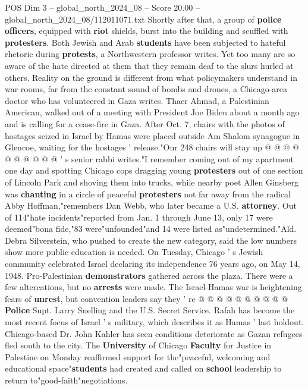 \begin{textsample}{POS Dim 3 – global\_north\_2024\_08 – Score 20.00 – global\_north\_2024\_08/112011071.txt}
Shortly after that, a group of \textbf{police} \textbf{officers}, equipped with \textbf{riot} shields, burst into the building and scuffled with \textbf{protesters}.
Both Jewish and Arab \textbf{students} have been subjected to hateful rhetoric during \textbf{protests}, a Northwestern professor writes.
Yet too many are so aware of the hate directed at them that they remain deaf to the slurs hurled at others.
Reality on the ground is different from what policymakers understand in war rooms, far from the constant sound of bombs and drones, a Chicago-area doctor who has volunteered in Gaza writes.
Thaer Ahmad, a Palestinian American, walked out of a meeting with President Joe Biden about a month ago and is calling for a cease-fire in Gaza.
After Oct. 7, chairs with the photos of hostages seized in Israel by Hamas were placed outside Am Shalom synagogue in Glencoe, waiting for the hostages ' release."Our 248 chairs will stay up @ @ @ @ @ @ @ @ @ @ ' s senior rabbi writes."I remember coming out of my apartment one day and spotting Chicago cops dragging young \textbf{protesters} out of one section of Lincoln Park and shoving them into trucks, while nearby poet Allen Ginsberg was \textbf{chanting} in a circle of peaceful \textbf{protesters} not far away from the radical Abby Hoffman,"remembers Dan Webb, who later became a U.S. \textbf{attorney}.
Out of 114"hate incidents"reported from Jan. 1 through June 13, only 17 were deemed"bona fide,"83 were"unfounded"and 14 were listed as"undetermined."Ald.
Debra Silverstein, who pushed to create the new category, said the low numbers show more public education is needed.
On Tuesday, Chicago ' s Jewish community celebrated Israel declaring its independence 76 years ago, on May 14, 1948.
Pro-Palestinian \textbf{demonstrators} gathered across the plaza.
There were a few altercations, but no \textbf{arrests} were made.
The Israel-Hamas war is heightening fears of \textbf{unrest}, but convention leaders say they ' re @ @ @ @ @ @ @ @ @ @ \textbf{Police} Supt.
Larry Snelling and the U.S.
Secret Service.
Rafah has become the most recent focus of Israel ' s military, which describes it as Hamas ' last holdout.
Chicago-based Dr.
John Kahler has seen conditions deteriorate as Gazan refugees fled south to the city.
The \textbf{University} of Chicago \textbf{Faculty} for Justice in Palestine on Monday reaffirmed support for the"peaceful, welcoming and educational space"\textbf{students} had created and called on \textbf{school} leadership to return to"good-faith"negotiations.

\end{textsample}

